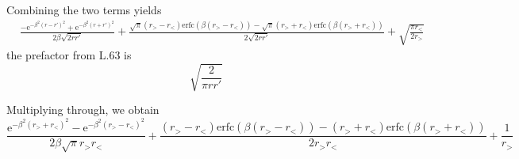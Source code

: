 \documentclass[paper=a4, fontsize=11pt]{article} %
\numberwithin{equation}{section} %
\numberwithin{figure}{section} %
\numberwithin{table}{section} %
\newcommand{\re}{{\mathrm{e}}}
\newcommand{\rerfc}{{\mathrm{erfc}}}
\begin{document}
Combining the two terms yields
\begin{equation}
\begin{split}
&\frac{-\re^{-\beta^2(r-r')^2 } + \re^{-\beta^2(r+r')^2 }}{2\beta \sqrt{2 r r'}} + \frac{\sqrt{\pi}(r_> - r_<)\rerfc\left(\beta(r_> - r_<)\right) - \sqrt{\pi}(r_> + r_<)\rerfc\left(\beta(r_> + r_<)\right)}{2\sqrt{2rr'}} + \sqrt{\frac{ \pi r_<}{2r_>}}
\end{split}
\end{equation}
the prefactor from L.63 is
\begin{equation}
\sqrt{\frac{2}{\pi r r'}} 
\end{equation}

Multiplying through, we obtain
\begin{equation}
\frac{\re^{-\beta^2(r_>+r_<)^2 }-\re^{-\beta^2(r_>-r_<)^2 }}{2\beta \sqrt{\pi}r_> r_< } + \frac{(r_> - r_<)\rerfc\left(\beta(r_> - r_<)\right) - (r_> + r_<)\rerfc\left(\beta(r_> + r_<)\right)}{2 r_>r_<} + \frac{1}{r_>}
\end{equation}
\end{document}
